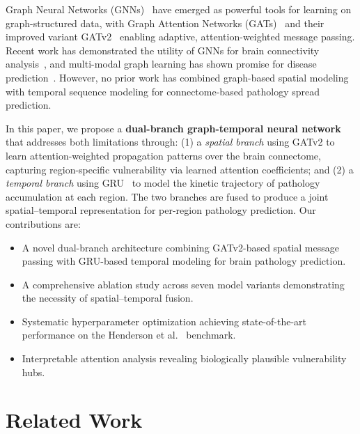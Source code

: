\documentclass[conference]{IEEEtran}
\begin{document}
Graph Neural Networks (GNNs)~\cite{kipf2017semi} have emerged as powerful tools for learning on graph-structured data, with Graph Attention Networks (GATs)~\cite{velickovic2018graph} and their improved variant GATv2~\cite{brody2022how} enabling adaptive, attention-weighted message passing. Recent work has demonstrated the utility of GNNs for brain connectivity analysis~\cite{li2021braingnn, shojaie2025graph}, and multi-modal graph learning has shown promise for disease prediction~\cite{zheng2022multi}. However, no prior work has combined graph-based spatial modeling with temporal sequence modeling for connectome-based pathology spread prediction.

In this paper, we propose a \textbf{dual-branch graph-temporal neural network} that addresses both limitations through: (1) a \textit{spatial branch} using GATv2 to learn attention-weighted propagation patterns over the brain connectome, capturing region-specific vulnerability via learned attention coefficients; and (2) a \textit{temporal branch} using GRU~\cite{cho2014learning} to model the kinetic trajectory of pathology accumulation at each region. The two branches are fused to produce a joint spatial--temporal representation for per-region pathology prediction. Our contributions are:

\begin{itemize}
    \item A novel dual-branch architecture combining GATv2-based spatial message passing with GRU-based temporal modeling for brain pathology prediction.
    \item A comprehensive ablation study across seven model variants demonstrating the necessity of spatial--temporal fusion.
    \item Systematic hyperparameter optimization achieving state-of-the-art performance on the Henderson et al.~\cite{henderson2019spread} benchmark.
    \item Interpretable attention analysis revealing biologically plausible vulnerability hubs.
\end{itemize}

\section{Related Work}
\end{document}
